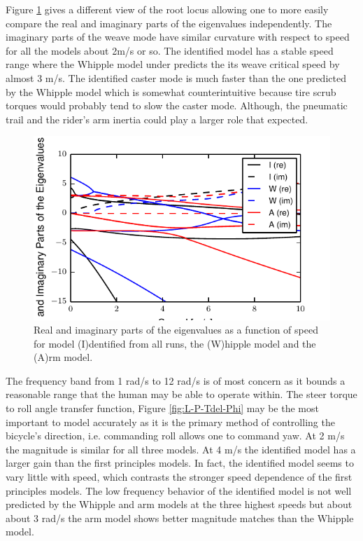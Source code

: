 \documentclass[a4paper]{article}
\begin{document}
Figure \ref{fig:L-P-eig} gives a different view of the root locus allowing one
to more easily compare the real and imaginary parts of the eigenvalues
independently. The imaginary parts of the weave mode have similar curvature
with respect to speed for all the models about 2m/s or so. The identified model
has a stable speed range where the Whipple model under predicts the its weave
critical speed by almost 3 m/s. The identified caster mode is much faster than
the one predicted by the Whipple model which is somewhat counterintuitive
because tire scrub torques would probably tend to slow the caster mode.
Although, the pneumatic trail and the rider's arm inertia could play a larger
role that expected.

\begin{figure}
  \label{fig:L-P-eig}
  \includegraphics[width=5in]{figures/L-P-eig.pdf}
  \caption{Real and imaginary parts of the eigenvalues as a function of speed
    for model (I)dentified from all runs, the (W)hipple model and the (A)rm
  model.}
\end{figure}

The frequency band from 1 rad/s to 12 rad/s is of most concern as it bounds a
reasonable range that the human may be able to operate within. The steer torque
to roll angle transfer function, Figure \ref{fig:L-P-Tdel-Phi} may be the most
important to model accurately as it is the primary method of controlling the
bicycle's direction, i.e. commanding roll allows one to command yaw. At 2 m/s
the magnitude is similar for all three models. At 4 m/s the identified model
has a larger gain than the first principles models. In fact, the identified
model seems to vary little with speed, which contrasts the stronger speed
dependence of the first principles models. The low frequency behavior of the
identified model is not well predicted by the Whipple and arm models at the
three highest speeds but about about 3 rad/s the arm model shows better
magnitude matches than the Whipple model.
\end{document}
